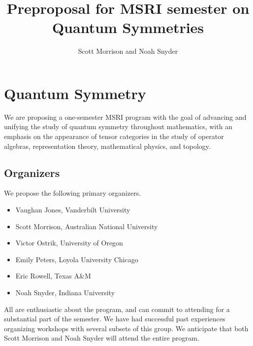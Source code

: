 \documentclass[11pt]{article}
\title{Preproposal for MSRI semester on \textbf{Quantum Symmetries}}
\author{Scott Morrison and Noah Snyder}
\begin{document}
\maketitle



\section{Quantum Symmetry}


We are proposing a one-semester MSRI program with the goal of advancing and unifying the study of quantum symmetry throughout mathematics, with an emphasis on the appearance of tensor categories in the study of operator algebras, representation theory, mathematical physics, and topology.

\subsection{Organizers}
We propose the following primary organizers.
\begin{itemize}
  \setlength{\itemsep}{1pt}
  \setlength{\parskip}{0pt}
  \setlength{\parsep}{0pt}
\item Vaughan Jones, Vanderbilt University
\item Scott Morrison, Australian National University
\item Victor Ostrik, University of Oregon
\item Emily Peters, Loyola University Chicago
\item Eric Rowell, Texas A\&M
\item Noah Snyder, Indiana University
\end{itemize}
All are enthusiastic about the program, and can commit to attending for a substantial part of the semester. We have had successful past experiences organizing workshops with several subsets of this group. We anticipate that both Scott Morrison and Noah Snyder will attend the entire program.
\end{document}
